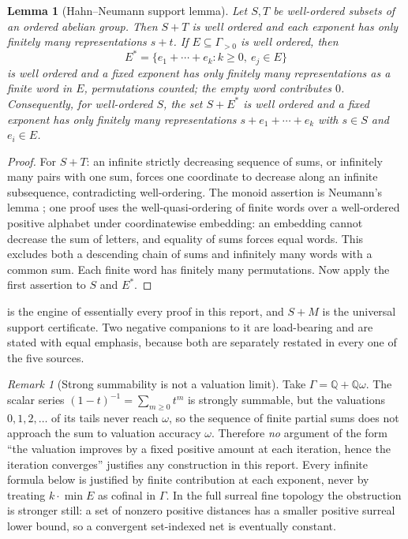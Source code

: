 \documentclass[11pt,letterpaper]{article}
\newtheorem{lemma}[theorem]{Lemma}
\theoremstyle{definition}
\theoremstyle{remark}
\newtheorem{remark}[theorem]{Remark}
\newcommand{\Q}{\mathbb Q}
\numberwithin{equation}{section}
\begin{document}
\begin{lemma}[Hahn--Neumann support lemma]
\label{finite:lem:support}
Let $S,T$ be well-ordered subsets of an ordered abelian group. Then $S+T$ is well ordered and each exponent has only finitely many representations $s+t$. If $E\subseteq\Gamma_{>0}$ is well ordered, then
\[
 E^*=\{e_1+\cdots+e_k:k\geq0,\ e_j\in E\}
\]
is well ordered and a fixed exponent has only finitely many representations as a finite word in $E$, permutations counted; the empty word contributes $0$. Consequently, for well-ordered $S$, the set $S+E^*$ is well ordered and a fixed exponent has only finitely many representations $s+e_1+\cdots+e_k$ with $s\in S$ and $e_i\in E$.
\end{lemma}

\begin{proof}
For $S+T$: an infinite strictly decreasing sequence of sums, or infinitely many pairs with one sum, forces one coordinate to decrease along an infinite subsequence, contradicting well-ordering. The monoid assertion is Neumann's lemma \cite{finite:Neumann}; one proof uses the well-quasi-ordering of finite words over a well-ordered positive alphabet under coordinatewise embedding: an embedding cannot decrease the sum of letters, and equality of sums forces equal words. This excludes both a descending chain of sums and infinitely many words with a common sum. Each finite word has finitely many permutations. Now apply the first assertion to $S$ and $E^*$.
\end{proof}

 is the engine of essentially every proof in this report, and $S+M$ is the universal support certificate. Two negative companions to it are load-bearing and are stated with equal emphasis, because both are separately restated in every one of the five sources.

\begin{remark}[Strong summability is not a valuation limit]
\label{finite:rem:notlimit}
Take $\Gamma=\Q+\Q\omega$. The scalar series $(1-t)^{-1}=\sum_{m\geq0}t^m$ is strongly summable, but the valuations $0,1,2,\ldots$ of its tails never reach $\omega$, so the sequence of finite partial sums does not approach the sum to valuation accuracy $\omega$. Therefore \emph{no} argument of the form ``the valuation improves by a fixed positive amount at each iteration, hence the iteration converges'' justifies any construction in this report. Every infinite formula below is justified by finite contribution at each exponent, never by treating $k\cdot\min E$ as cofinal in $\Gamma$. In the full surreal fine topology the obstruction is stronger still: a set of nonzero positive distances has a smaller positive surreal lower bound, so a convergent set-indexed net is eventually constant.
\end{remark}
\end{document}
